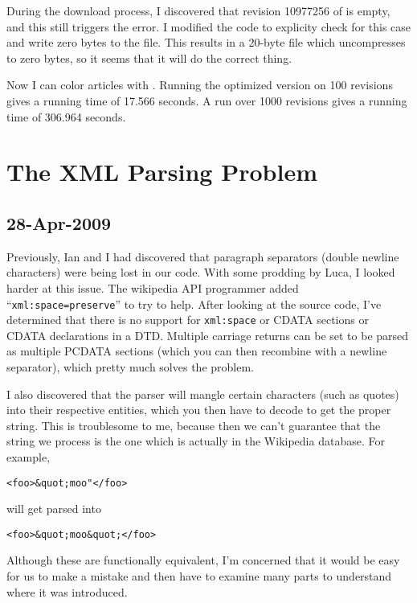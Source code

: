 During the download process, I discovered that revision 10977256 of
 is empty, and this still triggers the 
error.
I modified the code to explicity check for this case and write
zero bytes to the file.  This results in a 20-byte file which
uncompresses to zero bytes, so it seems that it will do the
correct thing.

Now I can color articles with .
Running the optimized version on 100 revisions gives a running
time of 17.566 seconds.
A run over 1000 revisions gives a running time of 306.964 seconds.


\section{The XML Parsing Problem}
\label{sec:up2date-xml}

\subsection{28-Apr-2009}

Previously, Ian and I had discovered that paragraph separators
(double newline characters) were being lost in our code.
With some prodding by Luca, I looked harder at this issue.
The wikipedia API programmer added ``\texttt{xml:space=preserve}''
to try to help.
After looking at the  source code, I've
determined that there is no support for \texttt{xml:space}
or CDATA sections or CDATA declarations in a DTD.
Multiple carriage returns can be set to be parsed as multiple
PCDATA sections (which you can then recombine with a newline
separator), which pretty much solves the problem.

I also discovered that the parser will mangle certain characters
(such as quotes) into their respective entities, which you
then have to decode to get the proper string.
This is troublesome to me, because then we can't guarantee
that the string we process is the one which is actually in
the Wikipedia database.  For example,
\begin{verbatim}
<foo>&quot;moo"</foo>
\end{verbatim}
will get parsed into
\begin{verbatim}
<foo>&quot;moo&quot;</foo>
\end{verbatim}
Although these are functionally equivalent, I'm concerned that
it would be easy for us to make a mistake and then have to
examine many parts to understand where it was introduced.

